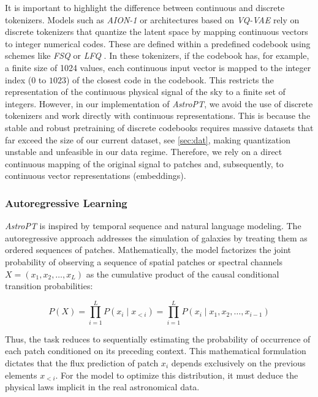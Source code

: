It is important to highlight the difference between continuous and discrete tokenizers. Models such as \textit{AION-1} or architectures based on \textit{\gls{VQ-VAE}} \autocite{ar:vq-vae} rely on discrete tokenizers that quantize the latent space by mapping continuous vectors to integer numerical codes. These are defined within a predefined codebook using schemes like \textit{\gls{FSQ}} \autocite{ar:mentzer-2023} or \textit{\gls{LFQ}} \autocite{ar:yu-2023}. In these tokenizers, if the codebook has, for example, a finite size of 1024 values, each continuous input vector is mapped to the integer index ($0$ to $1023$) of the closest code in the codebook. This restricts the representation of the continuous physical signal of the sky to a finite set of integers. However, in our implementation of \textit{AstroPT}, we avoid the use of discrete tokenizers and work directly with continuous representations. This is because the stable and robust pretraining of discrete codebooks requires massive datasets that far exceed the size of our current dataset, see \cref{sec:dat}, making quantization unstable and unfeasible in our data regime. Therefore, we rely on a direct continuous mapping of the original signal to patches and, subsequently, to continuous vector representations (embeddings).

\subsubsection{Autoregressive Learning}

\textit{AstroPT} \autocite{ar:astropt} is inspired by temporal sequence and natural language modeling. The autoregressive approach addresses the simulation of galaxies by treating them as ordered sequences of patches. Mathematically, the model factorizes the joint probability of observing a sequence of spatial patches or spectral channels $X = \left(x_1, x_2, \dots, x_L\right)$ as the cumulative product of the causal conditional transition probabilities:

\begin{equation}
P\left(X\right) = \prod_{i=1}^{L} P\left(x_i \mid x_{<i}\right) = \prod_{i=1}^{L} P\left(x_i \mid x_1, x_2, \dots, x_{i-1}\right)
\label{eq:autoregressive_probability}
\end{equation}

Thus, the task reduces to sequentially estimating the probability of occurrence of each patch conditioned on its preceding context. This mathematical formulation dictates that the flux prediction of patch $x_i$ depends exclusively on the previous elements $x_{<i}$. For the model to optimize this distribution, it must deduce the physical laws implicit in the real astronomical data.

